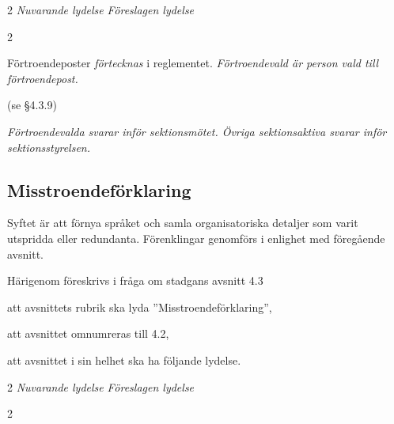 \documentclass{article}
\newenvironment{lydelse}
    {\begin{paracol}{2}%
        \emph{Nuvarande lydelse}%
        \switchcolumn%
        \emph{Föreslagen lydelse}%
    \end{paracol}%
    \begin{enumerate}[label=\thesubsection.\arabic*]%
    \begin{paracol}{2}%
    }{\end{paracol}\end{enumerate}}
\begin{document}
\begin{lydelse}
    \item Förtroendeposter \emph{förtecknas} i reglementet.\label{4.1:fortroende}
    \emph{Förtroendevald är person vald till förtroendepost.}
    
    \switchcolumn*
    (se \S 4.3.9)
    
    \switchcolumn
    \item \emph {Förtroendevalda svarar inför sektionsmötet. Övriga sektionsaktiva svarar inför sektionsstyrelsen.}
\end{lydelse}

\setcounter{subsection}{1}
\subsection{Misstroendeförklaring}
Syftet är att förnya språket och samla organisatoriska detaljer som varit utspridda eller redundanta.
Förenklingar genomförs i enlighet med föregående avsnitt.

Härigenom föreskrivs i fråga om stadgans avsnitt 4.3 \begin{dels}
    \item att avsnittets rubrik ska lyda ''Misstroendeförklaring'',
    \item att avsnittet omnumreras till 4.2,
    \item att avsnittet i sin helhet ska ha följande lydelse.
\end{dels}

\begin{lydelse}
   

\end{lydelse}
\end{document}
